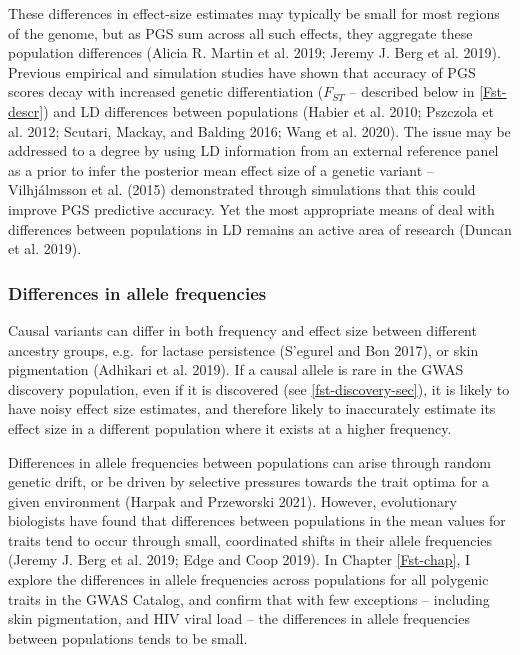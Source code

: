 \documentclass[
]{book}
\begin{document}
These differences in effect-size estimates may typically be small for most regions of the genome, but as PGS sum across all such effects, they aggregate these population differences (Alicia R. Martin et al. 2019; Jeremy J. Berg et al. 2019). Previous empirical and simulation studies have shown that accuracy of PGS scores decay with increased genetic differentiation (\(F_{ST}\) -- described below in \ref{Fst-descr}) and LD differences between populations (Habier et al. 2010; Pszczola et al. 2012; Scutari, Mackay, and Balding 2016; Wang et al. 2020). The issue may be addressed to a degree by using LD information from an external reference panel as a prior to infer the posterior mean effect size of a genetic variant -- Vilhjálmsson et al. (2015) demonstrated through simulations that this could improve PGS predictive accuracy. Yet the most appropriate means of deal with differences between populations in LD remains an active area of research (Duncan et al. 2019).

\hypertarget{differences-in-allele-frequencies}{%
\subsubsection{Differences in allele frequencies}\label{differences-in-allele-frequencies}}

Causal variants can differ in both frequency and effect size between different ancestry groups, e.g.~for lactase persistence (S'egurel and Bon 2017), or skin pigmentation (Adhikari et al. 2019). If a causal allele is rare in the GWAS discovery population, even if it is discovered (see \ref{fst-discovery-sec}), it is likely to have noisy effect size estimates, and therefore likely to inaccurately estimate its effect size in a different population where it exists at a higher frequency.

Differences in allele frequencies between populations can arise through random genetic drift, or be driven by selective pressures towards the trait optima for a given environment (Harpak and Przeworski 2021). However, evolutionary biologists have found that differences between populations in the mean values for traits tend to occur through small, coordinated shifts in their allele frequencies (Jeremy J. Berg et al. 2019; Edge and Coop 2019). In Chapter \ref{Fst-chap}, I explore the differences in allele frequencies across populations for all polygenic traits in the GWAS Catalog, and confirm that with few exceptions -- including skin pigmentation, and HIV viral load -- the differences in allele frequencies between populations tends to be small.
\end{document}
